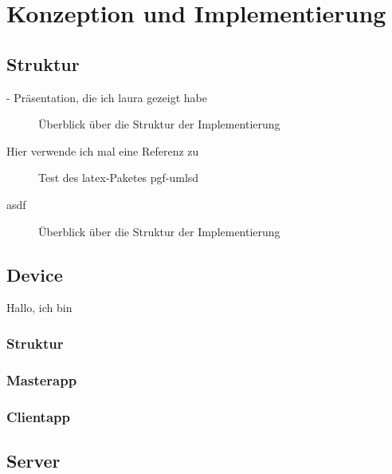 \chapter{Konzeption und Implementierung}
\label{Implementierung}
	\section{Struktur}
	\label{Implementierung:Struktur}
	- Präsentation, die ich laura gezeigt habe\\
	\begin{figure}[H]
		\centering
		
		\caption{Überblick über die Struktur der Implementierung}
		\label{fig:Implementierung:Struktur:Gesamt}					
	\end{figure}
	Hier verwende ich mal eine Referenz zu \cite{Krypczyk2018}
	\begin{figure}[H]
		\centering
		
		\caption{Test des latex-Paketes pgf-umlsd}
		\label{fig:Implementierung:Struktur:pgf-umlsd-test}		
	\end{figure}
	asdf
	\begin{figure}[H]
		\centering
		
		\caption{Überblick über die Struktur der Implementierung}
		\label{fig:Implementierung:Struktur:GesamtDiagramm}					
	\end{figure}
	\section{Device}
	Hallo, ich bin \faCcVisa
	\label{Implementierung:Device}
	
		\subsection{Struktur}
		\label{Implementierung:Device:Struktur}
	
		\subsection{Masterapp}
		\label{Implementierung:Device:Masterapp}
		
		\subsection{Clientapp}
		\label{Implementierung:Device:Clientapp}
		
	\section{Server}
	\label{Implementierung:Server}
		
